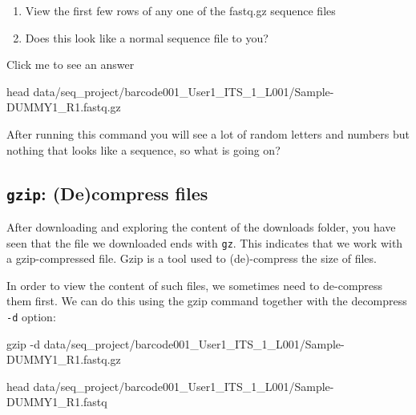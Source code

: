 \documentclass[
  letterpaper,
  DIV=11,
  numbers=noendperiod]{scrreprt}
\newenvironment{Shaded}{}{}
\newcommand{\AttributeTok}[1]{\textcolor[rgb]{0.84,0.23,0.29}{#1}}
\newcommand{\FunctionTok}[1]{\textcolor[rgb]{0.44,0.26,0.76}{#1}}
\newcommand{\NormalTok}[1]{\textcolor[rgb]{0.14,0.16,0.18}{#1}}
\providecommand{\tightlist}{%
  \setlength{\itemsep}{0pt}\setlength{\parskip}{0pt}}\usepackage{longtable,booktabs,array}
\begin{document}
\begin{tcolorbox}[enhanced jigsaw, rightrule=.15mm, colbacktitle=quarto-callout-caution-color!10!white, colframe=quarto-callout-caution-color-frame, colback=white, arc=.35mm, opacitybacktitle=0.6, coltitle=black, bottomtitle=1mm, breakable, bottomrule=.15mm, leftrule=.75mm, titlerule=0mm, title=\textcolor{quarto-callout-caution-color}{\faFire}\hspace{0.5em}{Exercise}, toprule=.15mm, toptitle=1mm, opacityback=0, left=2mm]

\begin{enumerate}
\def\labelenumi{\arabic{enumi}.}
\tightlist
\item
  View the first few rows of any one of the fastq.gz sequence files
\item
  Does this look like a normal sequence file to you?
\end{enumerate}

Click me to see an answer

\begin{Shaded}
\begin{Highlighting}[]
\FunctionTok{head}\NormalTok{ data/seq\_project/barcode001\_User1\_ITS\_1\_L001/Sample{-}DUMMY1\_R1.fastq.gz}
\end{Highlighting}
\end{Shaded}

After running this command you will see a lot of random letters and
numbers but nothing that looks like a sequence, so what is going on?

\end{tcolorbox}

\subsection{\texorpdfstring{\texttt{gzip}: (De)compress
files}{gzip: (De)compress files}}\label{gzip-decompress-files}

After downloading and exploring the content of the downloads folder, you
have seen that the file we downloaded ends with \texttt{gz}. This
indicates that we work with a gzip-compressed file. Gzip is a tool used
to (de)-compress the size of files.

In order to view the content of such files, we sometimes need to
de-compress them first. We can do this using the gzip command together
with the decompress \texttt{-d} option:

\begin{Shaded}
\begin{Highlighting}[]
\FunctionTok{gzip} \AttributeTok{{-}d}\NormalTok{ data/seq\_project/barcode001\_User1\_ITS\_1\_L001/Sample{-}DUMMY1\_R1.fastq.gz}

\FunctionTok{head}\NormalTok{ data/seq\_project/barcode001\_User1\_ITS\_1\_L001/Sample{-}DUMMY1\_R1.fastq}
\end{Highlighting}
\end{Shaded}
\end{document}
